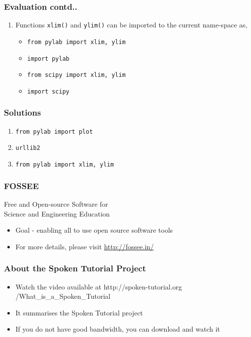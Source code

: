\documentclass[17pt,compress]{beamer}
\newcounter{saveenumi}
\newcommand{\conti}{\setcounter{enumi}{\value{saveenumi}}}
\begin{document}
\begin{frame}
\frametitle{Evaluation contd..}
\label{sec-16.3}

\begin{enumerate}
\conti
\item Functions \texttt{xlim()} and \texttt{ylim()} can be imported to the current
   name-space as,\pause
	\begin{itemize}
	\item \texttt{from pylab import xlim, ylim}
	\item \texttt{import pylab}
	\item \texttt{from scipy import xlim, ylim}
	\item \texttt{import scipy}
	\end{itemize}
\end{enumerate}
\end{frame}
\begin{frame}
\frametitle{Solutions}
\label{sec-17}

\begin{enumerate}
\item \texttt{from pylab import plot}\pause
\vspace{12pt}
\item \texttt{urllib2}\pause
\vspace{12pt}
\item \texttt{from pylab import xlim, ylim}
\end{enumerate}
\end{frame}
\begin{frame}
\frametitle{FOSSEE}
{\color{blue}Free and Open-source Software for \\Science and Engineering Education} \\
\begin{itemize}
\item Goal - enabling all to use open source software tools
\item For more details, please visit {\color{blue}\url{http://fossee.in/}}
\end{itemize}
\end{frame}
\begin{frame}
\frametitle{About the Spoken Tutorial Project}
\begin{itemize}
\item Watch the video available at {\color{blue}http://spoken-tutorial.org /What\_is\_a\_Spoken\_Tutorial}
\item It summarises the Spoken Tutorial project \pause
\item If you do not have good bandwidth, you can download and watch it
\end{itemize}
\end{frame}
\end{document}
